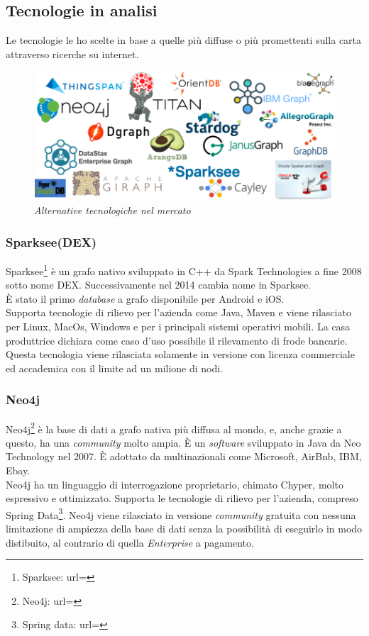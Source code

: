 \subsection{Tecnologie in analisi}
Le tecnologie le ho scelte in base a quelle più diffuse o più promettenti sulla carta attraverso ricerche su internet.
\begin{figure}[h!]
	\centering
	\includegraphics[scale=0.35]{immagini/graphdb.png}

	\caption{\textit{Alternative tecnologiche nel mercato }}
\end{figure}

\subsubsection{Sparksee(DEX)}
Sparksee\footnote{Sparksee: url= } è un grafo nativo sviluppato in C++ da Spark Technologies a fine 2008 sotto nome DEX. Successivamente nel 2014 cambia nome in Sparksee.\\
È stato il primo \textit{database} a grafo disponibile per Android e iOS.\\
Supporta tecnologie di rilievo per l'azienda come Java, Maven e viene rilasciato per Linux, MacOs, Windows e per i principali sistemi operativi mobili.
La casa produttrice dichiara come caso d'uso possibile il rilevamento di frode bancarie.\\
Questa tecnologia viene rilasciata solamente in versione con licenza commerciale ed accademica con il limite ad un milione di nodi.

\subsubsection{Neo4j}
Neo4j\footnote{Neo4j: url= } è la base di dati a grafo nativa più diffusa al mondo, e, anche grazie a questo, ha una \textit{community} molto ampia. È un \textit{software} sviluppato in Java da Neo Technology nel 2007. È adottato da multinazionali come Microsoft, AirBnb, IBM, Ebay.\\
Neo4j ha un linguaggio di interrogazione proprietario, chimato Chyper, molto espressivo e ottimizzato. Supporta le tecnologie di rilievo per l'azienda, compreso Spring Data\footnote{Spring data: url= }. Neo4j viene rilasciato in versione \textit{community} gratuita con nessuna limitazione di ampiezza della base di dati senza la possibilità di eseguirlo in modo distibuito, al contrario di quella \textit{Enterprise} a pagamento.

